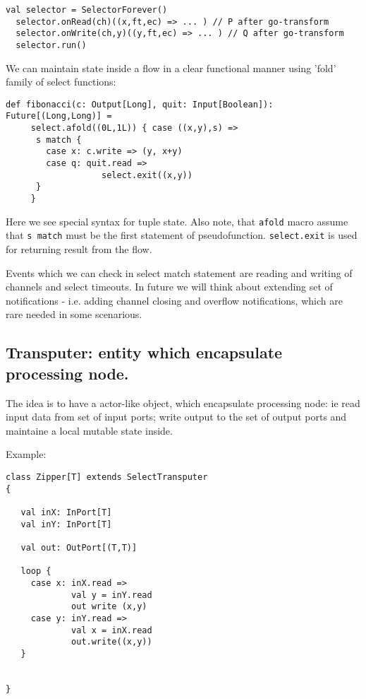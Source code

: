 \documentclass[12pt]{article}
\begin{document}
\begin{Verbatim}[fontsize=\small]
  val selector = SelectorForever()
  selector.onRead(ch)((x,ft,ec) => ... ) // P after go-transform
  selector.onWrite(ch,y)((y,ft,ec) => ... ) // Q after go-transform
  selector.run()
\end{Verbatim}

 We can maintain state inside a flow in a clear functional manner  using 'fold' family of select functions:

\begin{Verbatim}[fontsize=\small]
  def fibonacci(c: Output[Long], quit: Input[Boolean]): Future[(Long,Long)] =
     select.afold((0L,1L)) { case ((x,y),s) =>
      s match {
        case x: c.write => (y, x+y)
        case q: quit.read =>
                   select.exit((x,y))
      }
     }
\end{Verbatim}

  Here we see special syntax for tuple state. Also note, that \verb|afold| macro assume that \verb|s match| must be the first statement of pseudofunction. \verb|select.exit| is used for returning result from the flow.
 
  Events which we can check in select match statement are reading and writing of channels and select timeouts. In future we will think about extending set of notifications - i.e. adding channel closing and overflow notifications, which are rare needed in some scenarious.

\subsection{Transputer: entity which encapsulate processing node. }

 The idea is to have a actor-like object, which encapsulate processing node: ie read input data 
from set of input ports; write output to the set of output ports and maintaine a local 
mutable state inside.

Example:

\begin{Verbatim}[fontsize=\small]
class Zipper[T] extends SelectTransputer
{
 
   val inX: InPort[T]
   val inY: InPort[T]

   val out: OutPort[(T,T)] 

   loop {
     case x: inX.read => 
             val y = inY.read
             out write (x,y)
     case y: inY.read =>
             val x = inX.read
             out.write((x,y)) 
   }


}
\end{Verbatim}
\end{document}

